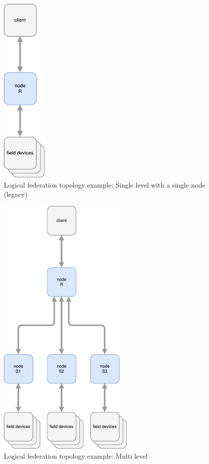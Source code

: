 \begin{figure}[]
	\center
	\includegraphics[width=0.2\textwidth]{img/topo_sl_noha.pdf}
	\caption{Logical federation topology example: Single level with a single node (legacy)}
	\label{fig:topo:sl:noha}
\end{figure}
\begin{figure}[]
	\center
	\includegraphics[width=0.6\textwidth]{img/topo_ml_noha.pdf}
	\caption{Logical federation topology example: Multi level}
	\label{fig:topo:ml:noha}
\end{figure}

